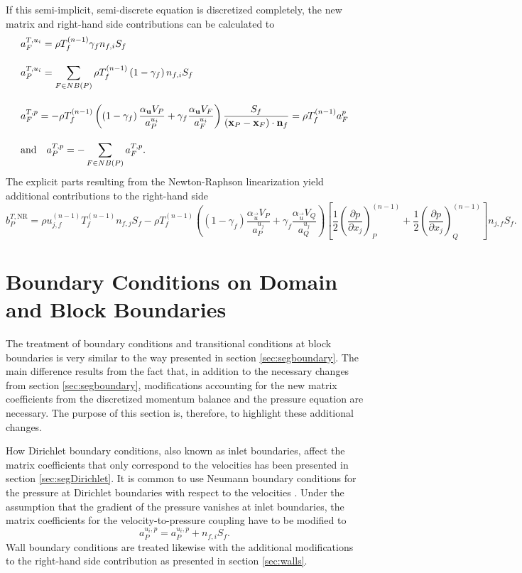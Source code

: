 If this semi-implicit, semi-discrete equation is discretized completely, the new matrix and right-hand side contributions can be calculated to
\begin{align*}
  \allowdisplaybreaks
  &a_F^{T,u_i} = \rho T_f^{(n-1)} \gamma_f n_{f,i} S_f \\[1.0em] 
  &a_P^{T,u_i} = \sum_{F \in NB(P)} \rho T_f^{(n-1)} \left(1-\gamma_f\right) n_{f,i} S_f \\[1.0em]
  &a_F^{T,p} = -\rho T_f^{(n-1)} \left(\left(1 - \gamma_f\right) \frac{\alpha_\vec{u} V_P}{a_P^{u_i}} + \gamma_f \frac{\alpha_\vec{u} V_F}{a_F^{u_i}}\right) \frac{S_f}{\left(\vec{x}_P - \vec{x}_F\right) \cdot \vec{n}_f} = \rho T_f^{(n-1)} a_F^{p} \\[1.0em] 
  &\text{and} \quad
  a_P^{T,p} = - \sum_{F \in NB(P)} a_F^{T,p}.
\end{align*}
The explicit parts resulting from the Newton-Raphson linearization yield additional contributions to the right-hand side
\begin{displaymath}
  b_P^{T,\text{NR}} 
  = 
  \rho u_{j,f}^{(n-1)} T_f^{(n-1)} n_{f,j} S_f 
  - \rho T_f^{(n-1)} \left(\left(1 - \gamma_f\right) \frac{\alpha_\vec{u} V_P}{a_P^{u_j}} + \gamma_f \frac{\alpha_\vec{u} V_Q}{a_Q^{u_j}}\right)
    \left[ 
    \frac{1}{2} \left( \frac{\partial p}{\partial x_j} \right)_P^{(n-1)} 
    + \frac{1}{2} \left(\frac{\partial p}{\partial x_j}\right)_Q^{(n-1)} 
    \right] n_{j,f} S_f.
\end{displaymath}

\section{Boundary Conditions on Domain and Block Boundaries}

The treatment of boundary conditions and transitional conditions at block boundaries is very similar to the way presented in section \ref{sec:segboundary}. The main difference results from the fact that, in addition to the necessary changes from section \ref{sec:segboundary}, modifications accounting for the new matrix coefficients from the discretized momentum balance and the pressure equation are necessary. The purpose of this section is, therefore, to highlight these additional changes.

How Dirichlet boundary conditions, also known as inlet boundaries, affect the matrix coefficients that only correspond to the velocities has been presented in section \ref{sec:segDirichlet}. It is common to use Neumann boundary conditions for the pressure at Dirichlet boundaries with respect to the velocities \cite{darwish09}. Under the assumption that the gradient of the pressure vanishes at inlet boundaries, the matrix coefficients for the velocity-to-pressure coupling have to be modified to 
\begin{displaymath}
  a_P^{u_i,p} = a_P^{u_i,p} + n_{f,i} S_f.
\end{displaymath}
Wall boundary conditions are treated likewise with the additional modifications to the right-hand side contribution as presented in section \ref{sec:walls}.

